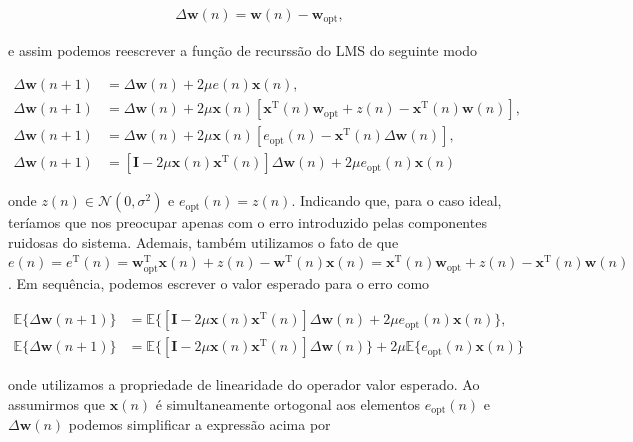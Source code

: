 \documentclass[a4paper,10pt]{article}
\begin{document}
\begin{enumerate}
\begin{enumerate}
						\begin{align}
							\Delta \mathbf{w}(n) = \mathbf{w}(n) - \mathbf{w}_{\text{opt}},
						\end{align}

						e assim podemos reescrever a função de recurssão do LMS do seguinte modo

						\begin{align}
							\Delta \mathbf{w}(n + 1) &= \Delta \mathbf{w}(n) + 2 \mu e(n) \mathbf{x}(n), \\
							\Delta \mathbf{w}(n + 1) &= \Delta \mathbf{w}(n) + 2 \mu \mathbf{x}(n) \left[\mathbf{x}^{\text{T}}(n)\mathbf{w}_{\text{opt}} + z(n) - \mathbf{x}^{\text{T}}(n)\mathbf{w}(n)\right], \\
							\Delta \mathbf{w}(n + 1) &= \Delta \mathbf{w}(n) + 2 \mu \mathbf{x}(n) \left[e_{\text{opt}}(n) - \mathbf{x}^{\text{T}}(n) \Delta \mathbf{w}(n)\right], \\
							\Delta \mathbf{w}(n + 1) &= \left[ \mathbf{I} - 2 \mu \mathbf{x}(n) \mathbf{x}^{\text{T}}(n) \right] \Delta \mathbf{w}(n) + 2 \mu e_{\text{opt}}(n) \mathbf{x}(n)
						\end{align}
					
						onde $z(n) \in \mathcal{N}(0,\sigma^{2})$ e $e_{\text{opt}}(n) = z(n)$. Indicando que, para o caso ideal, teríamos que nos preocupar apenas com o erro introduzido pelas componentes ruidosas do sistema.
						Ademais, também utilizamos o fato de que $e(n) = e^{\text{T}}(n) = \mathbf{w}^{\text{T}}_{\text{opt}}\mathbf{x}(n) + z(n) - \mathbf{w}^{\text{T}}(n)\mathbf{x}(n) = \mathbf{x}^{\text{T}}(n)\mathbf{w}_{\text{opt}} + z(n) - \mathbf{x}^{\text{T}}(n)\mathbf{w}(n)$.
						Em sequência, podemos escrever o valor esperado para o erro como

						\begin{align}
							\mathbb{E}\{\Delta \mathbf{w}(n + 1)\} &= \mathbb{E}\{\left[ \mathbf{I} - 2 \mu \mathbf{x}(n) \mathbf{x}^{\text{T}}(n) \right] \Delta \mathbf{w}(n) + 2 \mu e_{\text{opt}}(n) \mathbf{x}(n)\}, \\
							\mathbb{E}\{\Delta \mathbf{w}(n + 1)\} &= \mathbb{E}\{\left[ \mathbf{I} - 2 \mu \mathbf{x}(n) \mathbf{x}^{\text{T}}(n) \right] \Delta \mathbf{w}(n)\} + 2 \mu \mathbb{E}\{e_{\text{opt}}(n) \mathbf{x}(n)\}
						\end{align}
						
						onde utilizamos a propriedade de linearidade do operador valor esperado. Ao assumirmos que $\mathbf{x}(n)$ é simultaneamente ortogonal aos elementos $e_{\text{opt}}(n)$ e $\Delta \mathbf{w}(n)$ podemos simplificar a expressão acima por
						

\end{enumerate}
\end{enumerate}
\end{document}
